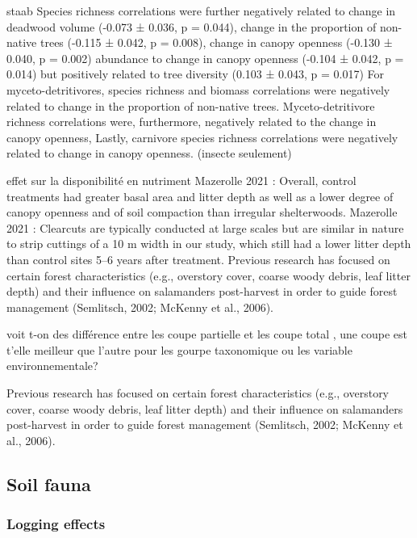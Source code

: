 staab
Species richness correlations were further negatively related to change in deadwood volume (-0.073 ± 0.036, p = 0.044), change in the proportion of non-native trees (-0.115 ± 0.042, p = 0.008), change in canopy openness (-0.130 ± 0.040, p = 0.002)
abundance to change in canopy openness (-0.104 ± 0.042, p = 0.014) but positively related to tree diversity (0.103 ± 0.043, p = 0.017)
For myceto-detritivores, species richness and biomass correlations were negatively related to change in the proportion of non-native trees. Myceto-detritivore richness correlations were, furthermore, negatively related to the change in canopy openness,
Lastly, carnivore species richness correlations were negatively related to change in canopy openness. (insecte seulement)

effet sur la disponibilité en nutriment
Mazerolle 2021 : Overall, control treatments had greater basal area and litter depth as well as a lower degree of canopy openness and of soil compaction than irregular shelterwoods.
Mazerolle 2021 : Clearcuts are typically conducted at large scales but are similar in nature to strip cuttings of a 10 m width in our study, which still had a lower litter depth than control sites 5–6 years after treatment.
Previous research has focused on certain forest characteristics (e.g., overstory cover, coarse woody debris, leaf litter depth) and their influence on salamanders post-harvest in order to guide forest management (Semlitsch, 2002; McKenny et al., 2006).

voit t-on des différence entre les coupe partielle et les coupe total , une coupe est t'elle meilleur que l'autre pour les gourpe taxonomique ou les variable environnementale?

Previous research has focused on certain forest characteristics (e.g., overstory cover, coarse woody debris, leaf litter depth) and their influence on salamanders post-harvest in order to guide forest management (Semlitsch, 2002; McKenny et al., 2006).



\subsection*{Soil fauna}
\label{disc:soil_fauna}


\subsubsection*{Logging effects}
\label{disc:logging_effects}

